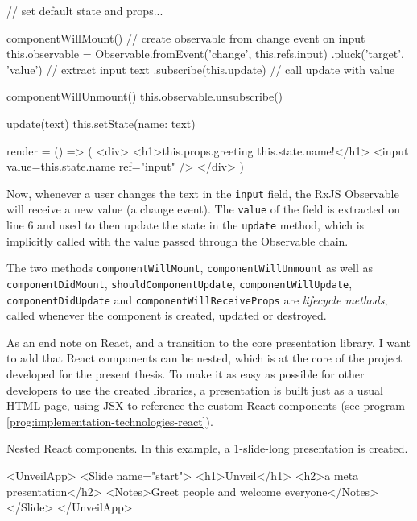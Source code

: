 %
\begin{JsCode}
// set default state and props...

componentWillMount() {
  // create observable from change event on input
  this.observable = Observable.fromEvent('change', this.refs.input)
    .pluck('target', 'value') // extract input text
    .subscribe(this.update) // call update with value
}

componentWillUnmount() { this.observable.unsubscribe() }

update(text) { this.setState({name: text}) }

render = () => (
  <div>
    <h1>{this.props.greeting} {this.state.name}!</h1>
    <input value={this.state.name} ref="input" />
  </div>
)
\end{JsCode}
%
Now, whenever a user changes the text in the \texttt{input} field, the RxJS Observable will receive a new value (a change event). The \texttt{value} of the field is extracted on line $6$ and used to then update the state in the \texttt{update} method, which is implicitly called with the value passed through the Observable chain.

The two methods \texttt{com\-po\-nent\-Will\-Mount}, \texttt{com\-po\-nent\-Will\-Un\-mount} as well as \texttt{com\-po\-nent\-Did\-Mount}, \texttt{should\-Com\-po\-nent\-Up\-date}, \texttt{com\-po\-nent\-Will\-Up\-date}, \texttt{com\-po\-nent\-Did\-Up\-date} and \texttt{com\-po\-nent\-Will\-Re\-ceive\-Props} are \emph{lifecycle methods}, called whenever the component is created, updated or destroyed.

As an end note on React, and a transition to the core presentation library, I want to add that React components can be nested, which is at the core of the project developed for the present thesis. To make it as easy as possible for other developers to use the created libraries, a presentation is built just as a usual HTML page, using JSX to reference the custom React components (see program \ref{prog:implementation-technologies-react}).
%

\begin{program}
\caption{Nested React components. In this example, a 1-slide-long presentation is created.}
\label{prog:implementation-technologies-react}
\begin{JsCode}
<UnveilApp>
  <Slide name="start">
    <h1>Unveil</h1>
    <h2>a meta presentation</h2>
    <Notes>Greet people and welcome everyone</Notes>
  </Slide>
</UnveilApp>
\end{JsCode}
\end{program}

